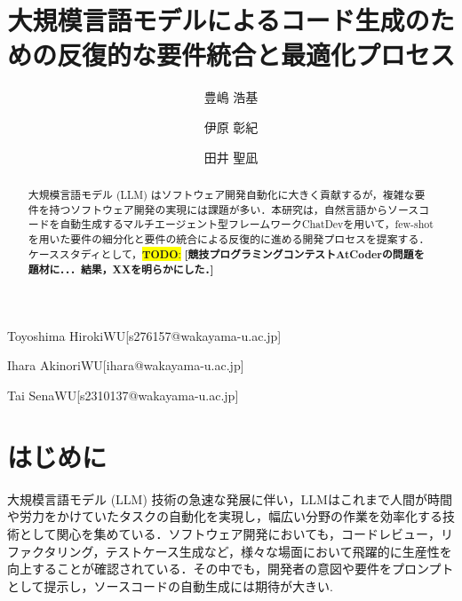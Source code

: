 \documentclass[submit,techrep,noauthor]{ipsj}
\newcommand{\todo}[1]{\colorbox{yellow}{{\bf TODO}:}{\color{red} {\textbf{[#1]}}}}
\begin{document}
\title{大規模言語モデルによるコード生成のための反復的な要件統合と最適化プロセス\\}




\author{豊嶋 浩基}{Toyoshima Hiroki}{WU}[s276157@wakayama-u.ac.jp]
\author{伊原 彰紀}{Ihara Akinori}{WU}[ihara@wakayama-u.ac.jp]
\author{田井 聖凪}{Tai Sena}{WU}[s2310137@wakayama-u.ac.jp]

\begin{abstract}
大規模言語モデル (LLM) はソフトウェア開発自動化に大きく貢献するが，複雑な要件を持つソフトウェア開発の実現には課題が多い．本研究は，自然言語からソースコードを自動生成するマルチエージェント型フレームワークChatDevを用いて，few-shotを用いた要件の細分化と要件の統合による反復的に進める開発プロセスを提案する．ケーススタディとして，\todo{競技プログラミングコンテストAtCoderの問題を題材に．．．結果，XXを明らかにした．}
\end{abstract}

\maketitle

\section{はじめに}

大規模言語モデル (LLM) 技術の急速な発展に伴い\cite{Growing_LLM}，LLMはこれまで人間が時間や労力をかけていたタスクの自動化を実現し，幅広い分野の作業を効率化する技術として関心を集めている．ソフトウェア開発においても，コードレビュー，リファクタリング，テストケース生成など，様々な場面において飛躍的に生産性を向上することが確認されている．\cite{LLM_CodeReview}\cite{LLM_Refactoring}\cite{LLM_Gene_Test}その中でも，開発者の意図や要件をプロンプトとして提示し，ソースコードの自動生成には期待が大きい.\cite{LLM_CodeGeneration}
\end{document}
